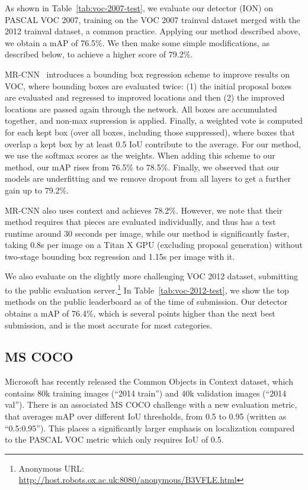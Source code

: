 \documentclass[10pt,twocolumn,letterpaper]{article}
\begin{document}
As shown in Table~\ref{tab:voc-2007-test}, we evaluate our detector (ION) on PASCAL
VOC 2007, training on the VOC 2007 trainval dataset merged with the 2012
trainval dataset, a common practice.  Applying our method described above, we obtain a mAP of
76.5\%.  We then make some simple modifications, as described below, to achieve
a higher score of 79.2\%.

MR-CNN~\cite{MR-CNN} introduces a bounding box regression scheme to improve
results on VOC, where bounding boxes are evaluated twice: (1) the initial
proposal boxes are evaluated and regressed to improved locations and then (2)
the improved locations are passed again through the network.  All boxes are
accumulated together, and non-max supression is applied.  Finally, a weighted
vote is computed for each kept box (over all boxes, including those
suppressed), where boxes that overlap a kept box by at least 0.5 IoU contribute
to the average.  For our method, we use the softmax scores as the weights.
When adding this scheme to our method, our mAP rises from 76.5\% to 78.5\%.
Finally, we observed that our models are underfitting and we remove dropout from
all layers to get a further gain up to 79.2\%.

MR-CNN also uses context and achieves 78.2\%.  However, we note that their
method requires that pieces are evaluated individually, and thus has a test
runtime around 30 seconds per image, while our method is significantly faster,
taking 0.8s per image on a Titan X GPU (excluding proposal generation) without
two-stage bounding box regression and 1.15s per image with it.

We also evaluate on the slightly more challenging VOC 2012 dataset, submitting
to the public evaluation server.\footnote{Anonymous URL:
\tiny{\url{http://host.robots.ox.ac.uk:8080/anonymous/B3VFLE.html}}}
In Table~\ref{tab:voc-2012-test}, we show the top methods on the public
leaderboard as of the time of submission.  Our detector obtains a mAP of 76.4\%,
which is several points higher than the next best submission, and is the most
accurate for most categories.

\subsection{MS COCO}\label{sec:results-mscoco}

Microsoft has recently released the Common Objects in Context dataset, which
contains 80k training images (``2014 train'') and 40k validation images (``2014
val'').  There is an associated MS COCO challenge with a new evaluation metric,
that averages mAP over different IoU thresholds, from 0.5 to 0.95 (written as
``0.5:0.95'').  This places a significantly larger emphasis on localization
compared to the PASCAL VOC metric which only requires IoU of 0.5.
\end{document}

